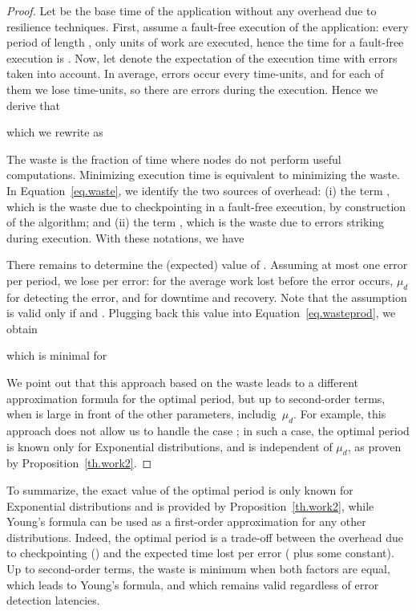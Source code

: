 \documentclass[10pt,table]{article}
\newcommand{\ema}[1]{\ensuremath{#1}\xspace}
\newcommand{\mud}{\ema{\mu_{d}}}
\begin{document}
\begin{proof}
Let  be the base time of the application without any overhead due
to resilience techniques.  First, assume a fault-free execution of the
application: every period of length , only  units of work are executed, 
hence the time  for a
fault-free execution is .
Now, let  denote the expectation of the execution time with errors taken into account.  
In average, errors occur every 
time-units, and for each of them we lose  time-units, so there
are  errors during the execution. Hence we
derive that 

which we rewrite as

The waste is the fraction of time where nodes do not perform useful
computations. Minimizing execution time is equivalent to minimizing the waste. 
In Equation~\eqref{eq.waste}, we identify the two
sources of overhead: (i) the term , which is the waste due to checkpointing in a fault-free
execution, by construction of the algorithm; and (ii) the term
, which is the waste due to
errors striking during execution.  With these notations, we have

There remains to determine the (expected) value of . 
Assuming at most one error per period, we lose 
 per error:
 for the average work lost before the error occurs, \mud for detecting the error, 
and  for downtime and recovery. Note that the assumption is valid only if
 and .
Plugging back this value into Equation~\eqref{eq.wasteprod},
we obtain 

which is minimal for 

We point out that this approach based on the waste leads to a different approximation
formula for the optimal period,
but  up to second-order terms, when  is large in front of the other parameters, includig~\mud.
For example, this approach does not allow us to handle the case ; in such a case, the optimal
period is known only for Exponential distributions, and is independent of \mud, as proven by
Proposition~\ref{th.work2}.
\end{proof}

To summarize, the exact value of the optimal period is only known for Exponential distributions and is provided  by Proposition~\ref{th.work2},  while  Young's formula can be used as a first-order approximation
for any other distributions.  Indeed, the
optimal period is a trade-off
between the overhead due to checkpointing () and the expected time lost per error
( plus some constant). Up to second-order terms, the waste is minimum when both factors are equal, which leads to Young's formula, and which remains valid regardless of error detection latencies.
\end{document}
